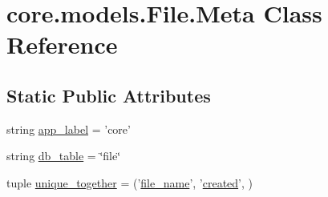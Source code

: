 \hypertarget{classcore_1_1models_1_1File_1_1Meta}{\section{core.\-models.\-File.\-Meta Class Reference}
\label{classcore_1_1models_1_1File_1_1Meta}
}
\subsection*{Static Public Attributes}
\begin{DoxyCompactItemize}
\item 
string \hyperlink{classcore_1_1models_1_1File_1_1Meta_aa438bad9ac4d8c2c33c8d82dee401064}{app\-\_\-label} = 'core'
\item 
string \hyperlink{classcore_1_1models_1_1File_1_1Meta_a242437c37915a3c022ca1f98234c85c5}{db\-\_\-table} = \char`\"{}file\char`\"{}
\item 
tuple \hyperlink{classcore_1_1models_1_1File_1_1Meta_a332f99ae6fdafafc25e0c77e74803074}{unique\-\_\-together} = ('\hyperlink{classcore_1_1models_1_1File_a00e09db629f9ff8114662c4e950927bb}{file\-\_\-name}', '\hyperlink{classcore_1_1models_1_1File_adaa3cc04ed44b20d1796df296373e9ba}{created}', )
\end{DoxyCompactItemize}


